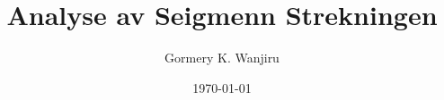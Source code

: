 \documentclass{article}
\begin{document}
\title{Analyse av Seigmenn Strekningen}
\author{Gormery K. Wanjiru}
\date{\today}
\maketitle
\end{document}
